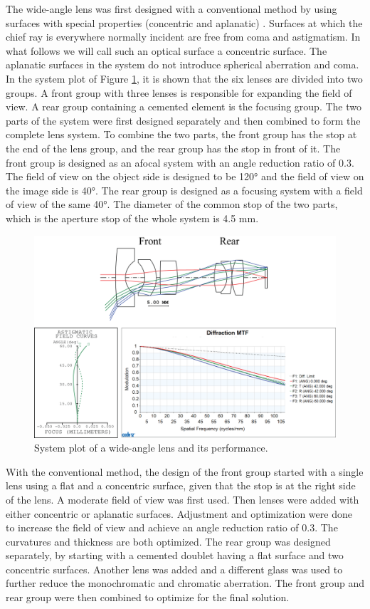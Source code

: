 The wide-angle lens was first designed with a conventional method by using surfaces with special properties (concentric and aplanatic) \cite{LivshitsQA2013}. Surfaces at which the chief ray is everywhere normally incident are free from coma and astigmatism. In what follows we will call such an optical surface a concentric surface. The aplanatic surfaces in the system do not introduce spherical aberration and coma. In the system plot of Figure \ref{fig:wideanglelensPerformance}, it is shown that the six lenses are divided into two groups. A front group with three lenses is responsible for expanding the field of view. A rear group containing a cemented element is the focusing group. The two parts of the system were first designed separately and then combined to form the complete lens system. To combine the two parts, the front group has the stop at the end of the lens group, and the rear group has the stop in front of it.  The front group is designed as an afocal system with an angle reduction ratio of 0.3. The field of view on the object side is designed to be 120° and the field of view on the image side is 40°. The rear group is designed as a focusing system with a field of view of the same 40°. The diameter of the common stop of the two parts, which is the aperture stop of the whole system is 4.5 mm. 

\begin{figure}[h!]
    \centering
    \includegraphics[scale=0.68]{chapter-4/figures/WideAngleL.png}
    \caption{System plot of a wide-angle lens and its performance.}
    \label{fig:wideanglelensPerformance}
\end{figure}

With the conventional method, the design of the front group started with a single lens using a flat and a concentric surface, given that the stop is at the right side of the lens. A moderate field of view was first used. Then lenses were added with either concentric or aplanatic surfaces. Adjustment and optimization were done to increase the field of view and achieve an angle reduction ratio of 0.3. The curvatures and thickness are both optimized. The rear group was designed separately, by starting with a cemented doublet having a flat surface and two concentric surfaces. Another lens was added and a different glass was used to further reduce the monochromatic and chromatic aberration. The front group and rear group were then combined to optimize for the final solution.

